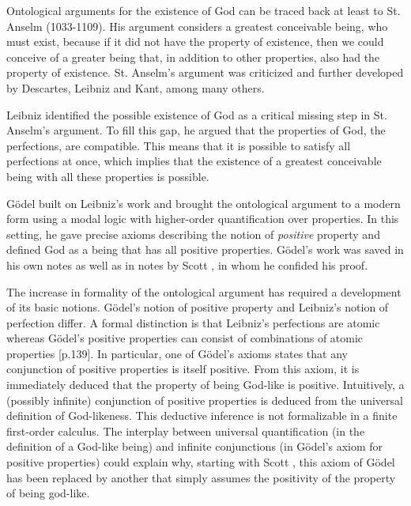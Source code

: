 \documentclass[smallextended]{svjour3}
\begin{document}
Ontological arguments for the existence of God can be traced back at least to St. Anselm (1033-1109). His argument considers a greatest conceivable being, who must exist, because if it did not have the property of existence, then we could conceive of a greater being that, in addition to other properties, also had the property of existence. St. Anselm's argument was criticized and further developed by Descartes, Leibniz and Kant, among many others. 

Leibniz identified the possible existence of God as a critical missing step in St. Anselm's argument. To fill this gap, he argued that the properties of God, the perfections, are compatible. This means that it is possible to satisfy all perfections at once, which implies that the existence of a greatest conceivable being with all these properties is possible. 

G\"odel built on Leibniz's work \citep{adams} and brought the ontological argument to a modern form using a modal logic with higher-order quantification over properties. In this setting, he gave precise axioms describing the notion of \emph{positive} property and defined God as a being that has all positive properties. G\"odel's work was saved in his own notes \citep{Goedel} as well as in notes by Scott \citep{scott}, in whom he confided his proof. 

The increase in formality of the ontological argument has required a development of its basic notions. G\"odel's notion of positive property and Leibniz's notion of perfection differ. A formal distinction is that Leibniz's perfections are atomic whereas G\"odel's positive properties can consist of combinations of atomic properties \citep{fitting}[p.139]. In particular, one of G\"odel's axioms states that any conjunction of positive properties is itself positive. From this axiom, it is immediately deduced that the property of being God-like is positive. Intuitively, a (possibly infinite) conjunction of positive properties is deduced from the universal definition of God-likeness. This deductive inference is not formalizable in a finite first-order calculus. The interplay between universal quantification (in the definition of a God-like being) and infinite conjunctions (in G\"odel's axiom for positive properties) could explain why, starting with Scott \citep{scott}, this axiom of G\"odel has been replaced by another that simply assumes the positivity of the property of being god-like. 
\end{document}
